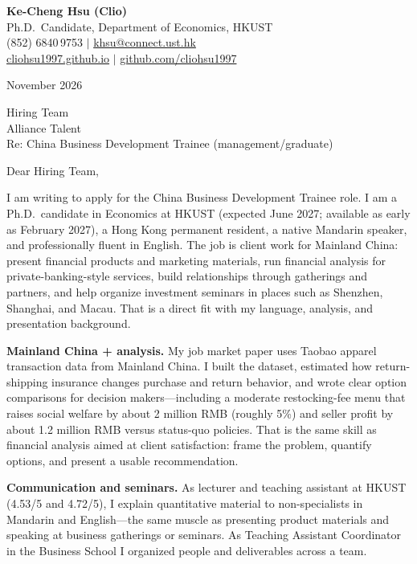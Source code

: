 \documentclass[11pt,letterpaper]{article}
\begin{document}
\noindent
{\bfseries Ke-Cheng Hsu (Clio)}\\
Ph.D.\ Candidate, Department of Economics, HKUST\\
(852) 6840\,9753 \quad $|$ \quad \href{mailto:khsu@connect.ust.hk}{khsu@connect.ust.hk}\\
\href{https://cliohsu1997.github.io/}{cliohsu1997.github.io} \quad $|$ \quad \href{https://github.com/cliohsu1997}{github.com/cliohsu1997}

\vspace{0.3em}
 November 2026

\vspace{0.2em}
\noindent
Hiring Team\\
Alliance Talent\\
Re: China Business Development Trainee (management/graduate)

\vspace{0.1em}
Dear Hiring Team,

I am writing to apply for the China Business Development Trainee role. I am a Ph.D.\ candidate in Economics at HKUST (expected June 2027; available as early as February 2027), a Hong Kong permanent resident, a native Mandarin speaker, and professionally fluent in English. The job is client work for Mainland China: present financial products and marketing materials, run financial analysis for private-banking-style services, build relationships through gatherings and partners, and help organize investment seminars in places such as Shenzhen, Shanghai, and Macau. That is a direct fit with my language, analysis, and presentation background.

\textbf{Mainland China + analysis.} My job market paper uses Taobao apparel transaction data from Mainland China. I built the dataset, estimated how return-shipping insurance changes purchase and return behavior, and wrote clear option comparisons for decision makers---including a moderate restocking-fee menu that raises social welfare by about 2 million RMB (roughly 5\%) and seller profit by about 1.2 million RMB versus status-quo policies. That is the same skill as financial analysis aimed at client satisfaction: frame the problem, quantify options, and present a usable recommendation.

\textbf{Communication and seminars.} As lecturer and teaching assistant at HKUST (4.53/5 and 4.72/5), I explain quantitative material to non-specialists in Mandarin and English---the same muscle as presenting product materials and speaking at business gatherings or seminars. As Teaching Assistant Coordinator in the Business School I organized people and deliverables across a team.
\end{document}
